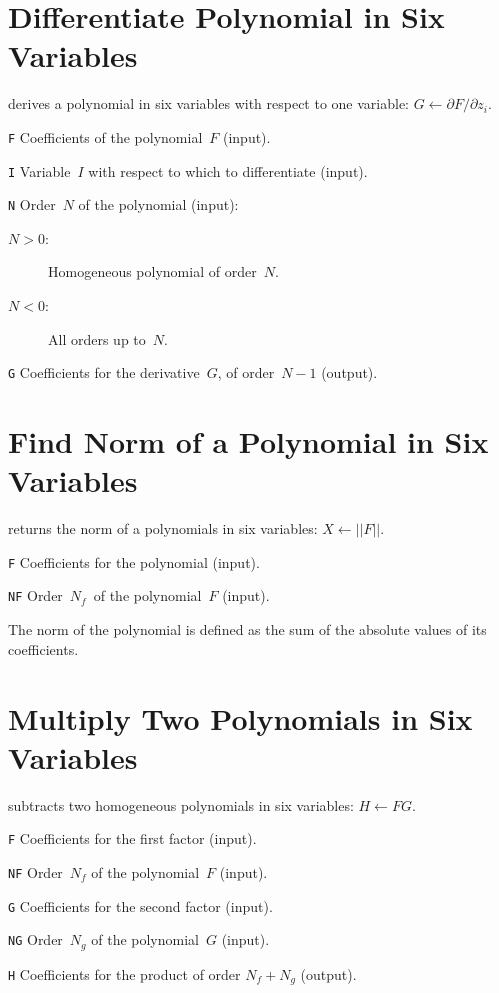 \section{Differentiate Polynomial in Six Variables}
\label{PA6DIF}
derives a polynomial in six variables with respect to one variable:
$G \leftarrow \partial F / \partial z_i$.
\begin{mylist}
\item[\tt F]
Coefficients of the polynomial~$F$ (input).
\item[\tt I]
Variable~$I$ with respect to which to differentiate (input).
\item[\tt N]
Order~$N$ of the polynomial (input):
\begin{description}
\item[$N > 0$:] Homogeneous polynomial of order~$N$.
\item[$N < 0$:] All orders up to~$N$.
\end{description}
\item[\tt G]
Coefficients for the derivative~$G$, of order~$N - 1$ (output).
\end{mylist}

\section{Find Norm of a Polynomial in Six Variables}
\label{PA6NRM}
returns the norm of a polynomials in six variables: $X \leftarrow ||F||$.
\begin{mylist}
\item[\tt F]
Coefficients for the polynomial (input).
\item[\tt NF]
Order~$N_f$~of the polynomial~$F$ (input).
\end{mylist}
The norm of the polynomial is defined as the sum of the absolute values
of its coefficients.

\section{Multiply Two Polynomials in Six Variables}
\label{PA6PRD}
subtracts two homogeneous polynomials in six variables: 
$H \leftarrow F G$. 
\begin{mylist}
\item[\tt F]
Coefficients for the first factor (input).
\item[\tt NF]
Order~$N_f$ of the polynomial~$F$ (input).
\item[\tt G]
Coefficients for the second factor (input).
\item[\tt NG]
Order~$N_g$ of the polynomial~$G$ (input).
\item[\tt H]
Coefficients for the product of order $N_f + N_g$ (output).
\end{mylist}


